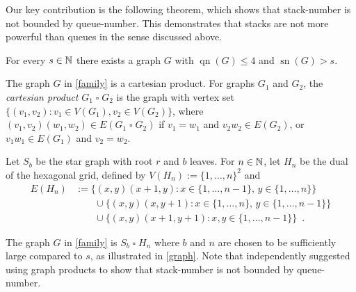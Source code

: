 \documentclass[kpfonts]{patmorin}
\DeclareMathOperator{\sn}{sn}
\DeclareMathOperator{\qn}{qn}
\renewcommand{\le}{\leqslant}
\newcommand{\CartProd}{\mathbin{\square}}
\begin{document}
Our key contribution is the following theorem, which shows that stack-number is not bounded by queue-number.
This demonstrates that stacks are not more powerful than queues in the sense discussed above.

\begin{thm}\label{family}
	For every $s\in \mathbb{N}$ there exists a graph $G$ with $\qn(G)\le 4$ and $\sn(G)>s$.
\end{thm}

The graph $G$ in \cref{family} is a cartesian product. For graphs $G_1$ and $G_2$, the \emph{cartesian product} $G_1\CartProd G_2$ is the graph with vertex set $\{(v_1,v_2): v_1 \in V(G_1), v_2 \in V(G_2)\}$, where $(v_1,v_2)(w_1,w_2)\in E(G_1\CartProd G_2)$ if $v_1=w_1$ and $v_2w_2\in E(G_2)$, or $v_1w_1\in E(G_1)$ and $v_2=w_2$.

Let $S_b$ be the star graph with root $r$ and $b$ leaves. For $n\in\mathbb{N}$, let $H_n$ be the dual of the hexagonal grid, defined by $V(H_n):=\{1,\ldots,n\}^2$ and
\begin{align*}
E(H_n) & :=  \{(x,y)(x+1,y):x\in\{1,\ldots,n-1\},\,y\in\{1,\ldots,n\}\} \\
& \qquad \cup \{(x,y)(x,y+1):x\in\{1,\ldots,n\},\,y\in\{1,\ldots,n-1\}\} \\
& \qquad \cup \{(x,y)(x+1,y+1):x,y\in\{1,\ldots,n-1\}\} \enspace .
\end{align*}

The graph $G$ in \cref{family} is $S_b \CartProd H_n$ where $b$ and $n$ are chosen to be sufficiently large compared to $s$, as illustrated in \cref{graph}.
Note that \citet{Pupyrev20} independently suggested using graph products to show that stack-number is not bounded by queue-number.
\end{document}
